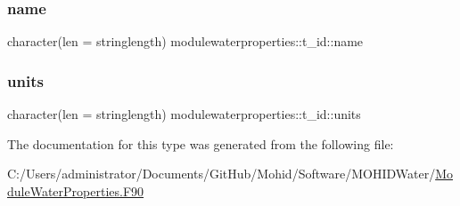 \subsubsection{\texorpdfstring{name}{name}}
{\footnotesize\ttfamily character(len = stringlength) modulewaterproperties\+::t\+\_\+id\+::name\hspace{0.3cm}{\ttfamily [private]}}

\mbox{\label{structmodulewaterproperties_1_1t__id_a3c3b1f53af0c15e101da0cfb3458e0b7}} 
\subsubsection{\texorpdfstring{units}{units}}
{\footnotesize\ttfamily character(len = stringlength) modulewaterproperties\+::t\+\_\+id\+::units\hspace{0.3cm}{\ttfamily [private]}}



The documentation for this type was generated from the following file\+:\begin{DoxyCompactItemize}
\item 
C\+:/\+Users/administrator/\+Documents/\+Git\+Hub/\+Mohid/\+Software/\+M\+O\+H\+I\+D\+Water/\mbox{\hyperlink{_module_water_properties_8_f90}{Module\+Water\+Properties.\+F90}}\end{DoxyCompactItemize}

